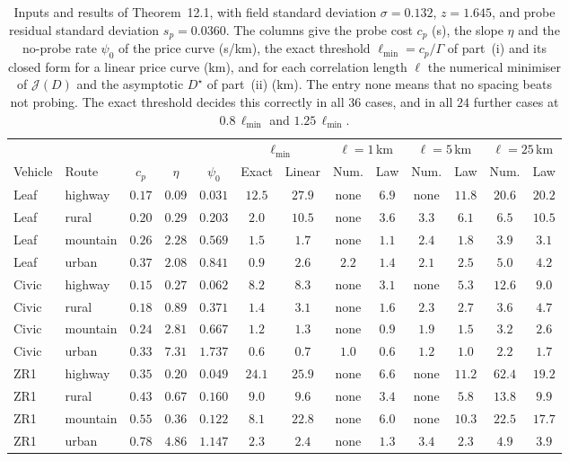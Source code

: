 \documentclass[12pt, twoside]{amsart}
\theoremstyle{definition}
\newcommand{\mainref}[2]{#2}
\begin{document}
\begin{table}[htbp]
\centering\small
\setlength{\tabcolsep}{3pt}
\caption{Inputs and results of Theorem~\mainref{thm:spacing}{12.1}, with field standard deviation $\sigma=0.132$, $z=1.645$, and probe residual standard deviation $s_p=0.0360$. The columns give the probe cost $c_p$ (s), the slope $\eta$ and the no-probe rate $\psi_0$ of the price curve (s/km), the exact threshold $\ell_{\min}=c_p/\Gamma$ of part~\mainref{sp:exact}{{(i)}} and its closed form for a linear price curve (km), and for each correlation length $\ell$ the numerical minimiser of $\mathcal J(D)$ and the asymptotic $D^\star$ of part~\mainref{sp:law}{{(ii)}} (km). The entry none means that no spacing beats not probing. The exact threshold decides this correctly in all $36$ cases, and in all $24$ further cases at $0.8\,\ell_{\min}$ and $1.25\,\ell_{\min}$.}\label{tab:app-spacing}
\begin{tabular}{llccccccccccc}
\toprule
& & & & & \multicolumn{2}{c}{$\ell_{\min}$} & \multicolumn{2}{c}{$\ell=1$\,km} & \multicolumn{2}{c}{$\ell=5$\,km} & \multicolumn{2}{c}{$\ell=25$\,km}\\
\cmidrule(lr){6-7}\cmidrule(lr){8-9}\cmidrule(lr){10-11}\cmidrule(lr){12-13}
Vehicle & Route & $c_p$ & $\eta$ & $\psi_0$ & Exact & Linear & Num. & Law & Num. & Law & Num. & Law\\
\midrule
Leaf & highway & $0.17$ & $0.09$ & $0.031$ & $12.5$ & $27.9$ & none & $6.9$ & none & $11.8$ & $20.6$ & $20.2$\\
Leaf & rural & $0.20$ & $0.29$ & $0.203$ & $2.0$ & $10.5$ & none & $3.6$ & $3.3$ & $6.1$ & $6.5$ & $10.5$\\
Leaf & mountain & $0.26$ & $2.28$ & $0.569$ & $1.5$ & $1.7$ & none & $1.1$ & $2.4$ & $1.8$ & $3.9$ & $3.1$\\
Leaf & urban & $0.37$ & $2.08$ & $0.841$ & $0.9$ & $2.6$ & $2.2$ & $1.4$ & $2.1$ & $2.5$ & $5.0$ & $4.2$\\
Civic & highway & $0.15$ & $0.27$ & $0.062$ & $8.2$ & $8.3$ & none & $3.1$ & none & $5.3$ & $12.6$ & $9.0$\\
Civic & rural & $0.18$ & $0.89$ & $0.371$ & $1.4$ & $3.1$ & none & $1.6$ & $2.3$ & $2.7$ & $3.6$ & $4.7$\\
Civic & mountain & $0.24$ & $2.81$ & $0.667$ & $1.2$ & $1.3$ & none & $0.9$ & $1.9$ & $1.5$ & $3.2$ & $2.6$\\
Civic & urban & $0.33$ & $7.31$ & $1.737$ & $0.6$ & $0.7$ & $1.0$ & $0.6$ & $1.2$ & $1.0$ & $2.2$ & $1.7$\\
ZR1 & highway & $0.35$ & $0.20$ & $0.049$ & $24.1$ & $25.9$ & none & $6.6$ & none & $11.2$ & $62.4$ & $19.2$\\
ZR1 & rural & $0.43$ & $0.67$ & $0.160$ & $9.0$ & $9.6$ & none & $3.4$ & none & $5.8$ & $13.8$ & $9.9$\\
ZR1 & mountain & $0.55$ & $0.36$ & $0.122$ & $8.1$ & $22.8$ & none & $6.0$ & none & $10.3$ & $22.5$ & $17.7$\\
ZR1 & urban & $0.78$ & $4.86$ & $1.147$ & $2.3$ & $2.4$ & none & $1.3$ & $3.4$ & $2.3$ & $4.9$ & $3.9$\\
\bottomrule
\end{tabular}
\end{table}
\end{document}
